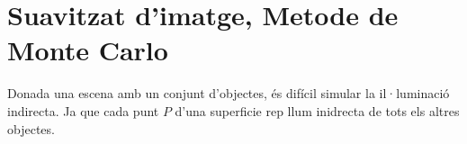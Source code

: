 \documentclass{article}
\begin{document}
\section{Suavitzat d'imatge, Metode de Monte Carlo}
Donada una escena amb un conjunt d'objectes, és difícil simular la il·luminació 
indirecta. Ja que cada punt $P$ d'una superficie
rep llum inidrecta de tots els altres objectes. 
\begin{figure}[h]
   \centering
   

\begin{tikzpicture}[x=0.75pt,y=0.75pt,yscale=-0.8,xscale=0.8]


\end{tikzpicture}
\end{figure}
\end{document}
